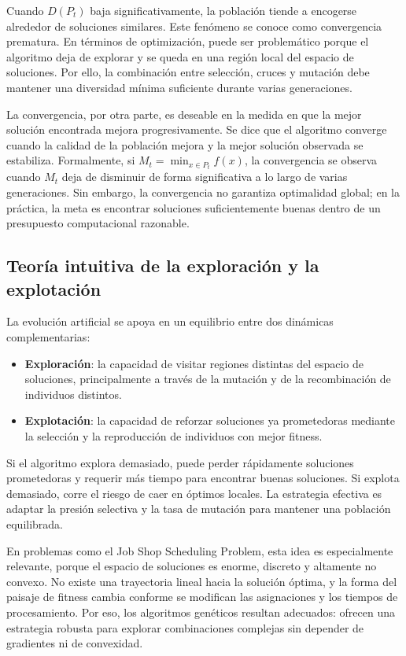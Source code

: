 \documentclass[11pt,a4paper]{article}
\begin{document}
Cuando $D(P_t)$ baja significativamente, la población tiende a encogerse alrededor de soluciones similares. Este fenómeno se conoce como convergencia prematura. En términos de optimización, puede ser problemático porque el algoritmo deja de explorar y se queda en una región local del espacio de soluciones. Por ello, la combinación entre selección, cruces y mutación debe mantener una diversidad mínima suficiente durante varias generaciones.

La convergencia, por otra parte, es deseable en la medida en que la mejor solución encontrada mejora progresivamente. Se dice que el algoritmo converge cuando la calidad de la población mejora y la mejor solución observada se estabiliza. Formalmente, si $M_t = \min_{x \in P_t} f(x)$, la convergencia se observa cuando $M_t$ deja de disminuir de forma significativa a lo largo de varias generaciones. Sin embargo, la convergencia no garantiza optimalidad global; en la práctica, la meta es encontrar soluciones suficientemente buenas dentro de un presupuesto computacional razonable.

\subsection{Teoría intuitiva de la exploración y la explotación}

La evolución artificial se apoya en un equilibrio entre dos dinámicas complementarias:

\begin{itemize}
    \item \textbf{Exploración}: la capacidad de visitar regiones distintas del espacio de soluciones, principalmente a través de la mutación y de la recombinación de individuos distintos.
    \item \textbf{Explotación}: la capacidad de reforzar soluciones ya prometedoras mediante la selección y la reproducción de individuos con mejor fitness.
\end{itemize}

Si el algoritmo explora demasiado, puede perder rápidamente soluciones prometedoras y requerir más tiempo para encontrar buenas soluciones. Si explota demasiado, corre el riesgo de caer en óptimos locales. La estrategia efectiva es adaptar la presión selectiva y la tasa de mutación para mantener una población equilibrada.

En problemas como el Job Shop Scheduling Problem, esta idea es especialmente relevante, porque el espacio de soluciones es enorme, discreto y altamente no convexo. No existe una trayectoria lineal hacia la solución óptima, y la forma del paisaje de fitness cambia conforme se modifican las asignaciones y los tiempos de procesamiento. Por eso, los algoritmos genéticos resultan adecuados: ofrecen una estrategia robusta para explorar combinaciones complejas sin depender de gradientes ni de convexidad.
\end{document}
